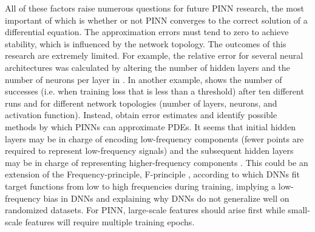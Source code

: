 \documentclass[pdflatex,sn-basic]{sn-jnl}%
\theoremstyle{thmstyleone}%
\theoremstyle{thmstyletwo}%
\theoremstyle{thmstylethree}%
\begin{document}
All of these factors raise numerous questions for future PINN research, the most important of which is whether or not PINN converges to the correct solution of a differential equation. 
The approximation errors must tend to zero to achieve stability, which is influenced by the network topology.
The outcomes of this research are extremely limited. 
%
For example, the relative error for several neural architectures was calculated by altering the number of hidden layers and the number of neurons per layer in
\cite{Mo2022_DataDrivenVector_LinMLZ}.
%
In another example, \cite{Ble2021_ThreeWaysSolve_ErnBE} shows the number of successes (i.e. when training loss that is less than a threshold) after ten different runs and for different network topologies (number of layers, neurons, and activation function).
%
Instead, \cite{Mis2021_EstimatesGeneralizationError_MolMM} obtain error estimates and identify possible methods by which PINNs can approximate PDEs. %
It seems that initial hidden layers may be in charge of encoding low-frequency components (fewer points are required to represent low-frequency signals) and the subsequent hidden layers may be in charge of representing higher-frequency components 
\citep{Mar2021_OldNewCan_Mar}.
This could be an extension of the Frequency-principle, F-principle \citep{Zhi2020_FrequencyPrincipleFourier_XuZX9}, according to which DNNs fit target functions from low to high frequencies during training, implying a low-frequency bias in DNNs and explaining why DNNs do not generalize well on randomized datasets. 
For PINN, large-scale features should arise first while small-scale features will require multiple training epochs. 
\end{document}
